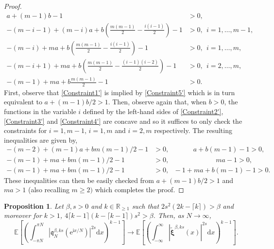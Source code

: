 \documentclass[]{article}
\newtheorem{prop}[thm]{Proposition}
\begin{document}
\begin{proof}
\begin{align}
a+(m-1)b-1&>0,\label{Constraint1'}\\
-(m-i-1)+(m-i)a+b\left(\frac{m(m-1)}{2}-\frac{i(i-1)}{2}\right)-1&>0, \  \ i=1,\dots,m-1,\label{Constraint2'}\\
-(m-i)+ma+b\left(\frac{m(m-1)}{2}-\frac{i(i-1)}{2}\right)-1&>0, \ \ i=1,\dots, m, \label{Constraint3'}\\
-(m-i+1)+ma+b\left(\frac{m(m-1)}{2}-\frac{(i-1)(i-2)}{2}\right)-1&>0, \ \ i=2,\dots,m,\label{Constraint4'}\\
-(m-1)+ma+b\frac{m(m-1)}{2}-1&>0\label{Constraint5'}.
\end{align}
First, observe that \eqref{Constraint1'} is implied by \eqref{Constraint5'} which is in turn equivalent to $a+(m-1)b/2>1$. Then, observe again that, when $b>0$, the functions in the variable $i$ defined by the left-hand sides of \eqref{Constraint2'}, \eqref{Constraint3'} and \eqref{Constraint4'} are concave and  so it suffices to only check the constraints for $i=1,m-1$, $i=1,m$ and $i=2,m$ respectively. The resulting inequalities are given by,
\begin{align*}
 -(m-2)+(m-1)a+bm(m-1)/2-1&>0,\ \ \ \ \ \ \ \ \ \ \ \ \ \  \ \  a+b(m-1)-1>0, \\
 -(m-1)+ma+bm(m-1)/2-1&>0, \ \ \ \ \ \ \ \ \ \ \ \ \ \ \ \ \ \ \ \ \ \ \ \ \ \ \ \ \ \  \ ma-1>0,\\
 -(m-1)+ma+bm(m-1)/2-1&>0, \ \ \  -1+ma+b(m-1)-1>0.
\end{align*}
These inequalities can then be easily checked from $a+(m-1)b/2>1$ and $ma>1$ (also recalling $m\ge 2)$ which completes the proof.
\end{proof}

\begin{prop}\label{PropNonInteger}
Let $\beta,s>0$ and $k \in \mathbb{R}_{\ge 1}$ such that $2s^2(2k-\lceil k \rceil)>\beta$ and moreover for $k>1$, $4\lceil k-1\rceil(k-\lceil k-1\rceil)s^2>\beta$. Then, as $N \to \infty$,
\begin{equation*}
\mathbb{E}\left[\left(\int_{-\pi N}^{\pi N}\left|\mathfrak{q}_N^{\beta,ks}(\mathrm{e}^{\mathrm{i}x/N})\right|^{2s}\mathrm{d}x\right)^{k-1}\right]\longrightarrow \mathbb{E}\left[\left(\int_{-\infty}^\infty \left|\tilde{\boldsymbol{\xi}}^{\beta,ks}(x)\right|^{2s}\mathrm{d}x\right)^{k-1}\right].
\end{equation*}
\end{prop}
\end{document}
